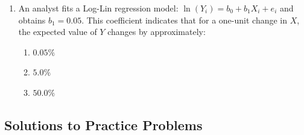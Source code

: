 \begin{enumerate}
	\item An analyst fits a Log-Lin regression model: $\ln(Y_i) = b_0 + b_1 X_i + e_i$ and obtains $b_1 = 0.05$. This coefficient indicates that for a one-unit change in $X$, the expected value of $Y$ changes by approximately:
	      \begin{enumerate}[label=\Alph*.]
		      \item $0.05\%$
		      \item $5.0\%$
		      \item $50.0\%$
	      \end{enumerate}
\end{enumerate}

\subsection{Solutions to Practice Problems}
\label{subsec:app_Solutions_M10}

